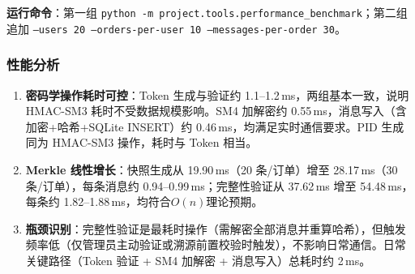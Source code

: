 \textbf{运行命令}：第一组 \texttt{python -m project.tools.performance\_benchmark}；第二组追加 \texttt{--users 20 --orders-per-user 10 --messages-per-order 30}。

\subsubsection*{性能分析}

\begin{enumerate}[label=\arabic*., leftmargin=2em]
\item \textbf{密码学操作耗时可控}：Token 生成与验证约 1.1--1.2\,ms，两组基本一致，说明 HMAC-SM3 耗时不受数据规模影响。SM4 加解密约 0.55\,ms，消息写入（含加密+哈希+SQLite INSERT）约 0.46\,ms，均满足实时通信要求。PID 生成同为 HMAC-SM3 操作，耗时与 Token 相当。

\item \textbf{Merkle 线性增长}：快照生成从 19.90\,ms（20 条/订单）增至 28.17\,ms（30 条/订单），每条消息约 0.94--0.99\,ms；完整性验证从 37.62\,ms 增至 54.48\,ms，每条约 1.82--1.88\,ms，均符合$O(n)$理论预期。

\item \textbf{瓶颈识别}：完整性验证是最耗时操作（需解密全部消息并重算哈希），但触发频率低（仅管理员主动验证或溯源前置校验时触发），不影响日常通信。日常关键路径（Token 验证 + SM4 加解密 + 消息写入）总耗时约 2\,ms。
\end{enumerate}
